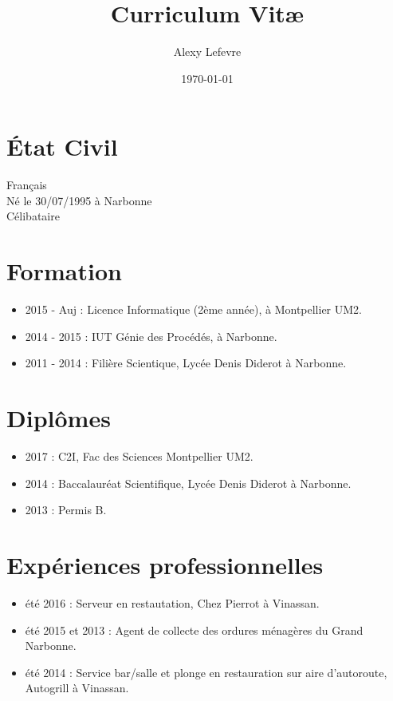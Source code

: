 \documentclass[a4paper]{article}
\title{Curriculum Vit\ae}
\author{Alexy Lefevre}
\date{\today}
\begin{document}
\maketitle

\section*{\'Etat Civil}
Français\\
Né le 30/07/1995 à Narbonne\\
Célibataire\\

\section*{Formation}

\begin{itemize}
\item 2015 - Auj : Licence Informatique (2ème année), à Montpellier UM2.
\item 2014 - 2015 : IUT Génie des Procédés, à Narbonne.
\item 2011 - 2014 : Filière Scientique, Lycée Denis Diderot à Narbonne.
\end{itemize}

\section*{Diplômes}

\begin{itemize}
\item 2017 : C2I, Fac des Sciences Montpellier UM2.
\item 2014 : Baccalauréat Scientifique, Lycée Denis Diderot à Narbonne.
\item 2013 : Permis B.
\end{itemize}

\section*{Expériences professionnelles}

\begin{itemize}
\item été 2016 : Serveur en restautation, Chez Pierrot à Vinassan.
\item été 2015 et 2013 : Agent de collecte des ordures ménagères du Grand Narbonne.
\item été 2014 : Service bar/salle et plonge en restauration sur aire d'autoroute, Autogrill à Vinassan.
\end{itemize}
\end{document}
